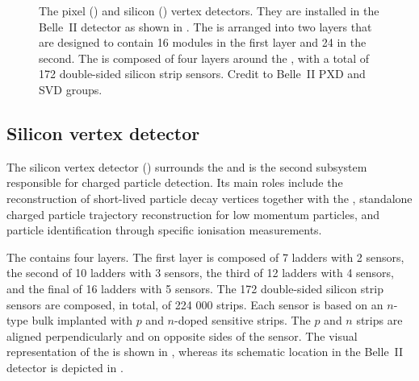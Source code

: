 \begin{figure}[hbtp!]
    \centering
    \caption{\label{fig:pxd_svd} 
    The pixel () and silicon () vertex detectors.
    They are installed in the Belle~II detector as shown in .
    The \PXD is arranged into two layers that are designed to contain 16 modules in the first layer and 24 in the second.
    The \SVD is composed of four layers around the \PXD, with a total of 172 double-sided silicon strip sensors.
    Credit to Belle~II PXD and SVD groups.}
\end{figure}

\subsection{Silicon vertex detector}\label{sec:svd}

The silicon vertex detector (\SVD) \cite{Belle-IISVD:2023mxk} surrounds the \PXD and 
is the second subsystem responsible for charged particle detection.
Its main roles include the reconstruction of short-lived particle decay vertices together with the \PXD,
standalone charged particle trajectory reconstruction for low momentum particles,
and particle identification through specific ionisation measurements.

The \SVD contains four layers. 
The first layer is composed of 7 ladders with 2 sensors,
the second of 10 ladders with 3 sensors,
the third of 12 ladders with 4 sensors,
and the final of 16 ladders with 5 sensors.
The 172 double-sided silicon strip sensors are composed, in total, of 224 000 strips.
Each sensor is based on an $n$-type bulk implanted with $p$ and $n$-doped sensitive strips.
The $p$ and $n$ strips are aligned perpendicularly and on opposite sides of the sensor.
The visual representation of the \SVD is shown in , whereas its schematic location in the Belle~II detector is depicted in .

